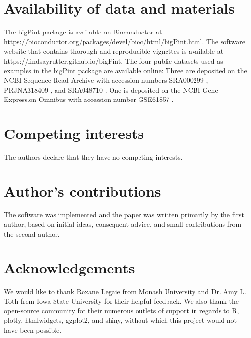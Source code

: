 \documentclass[parskip=full]{bmcart} %
\begin{document}
\begin{backmatter}

\section*{Availability of data and materials}
  The bigPint package is available on Bioconductor at https://bioconductor.org/packages/devel/bioc/html/bigPint.html. The software website that contains thorough and reproducible vignettes is available at https://lindsayrutter.github.io/bigPint. The four public datasets used as examples in the bigPint package are available online: Three are deposited on the NCBI Sequence Read Archive with accession numbers SRA000299 \cite{Marioni}, PRJNA318409 \cite{Lauter16}, and SRA048710 \cite{Risso}. One is deposited on the NCBI Gene Expression Omnibus with accession number GSE61857 \cite{Brown}.

\section*{Competing interests}
  The authors declare that they have no competing interests.

\section*{Author's contributions}
  The software was implemented and the paper was written primarily by the first author, based on initial ideas, consequent advice, and small contributions from the second author. 

\section*{Acknowledgements}
  We would like to thank Roxane Legaie from Monash University and Dr. Amy L. Toth from Iowa State University for their helpful feedback. We also thank the open-source community for their numerous outlets of support in regards to R, plotly, htmlwidgets, ggplot2, and shiny, without which this project would not have been possible.
  


\end{backmatter}
\end{document}
